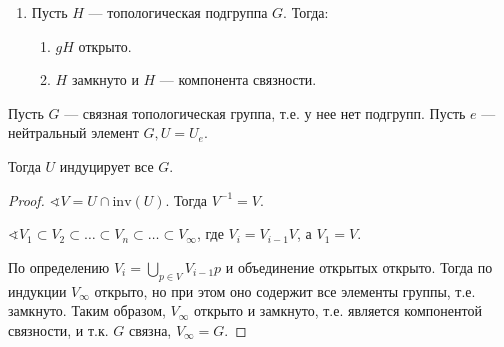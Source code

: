 \begin{prop}
\begin{enumerate}
		      \begin{proof}
			      Пусть \(e\) --- нейтральный элемент группы \(G\), \(V = V_e\).
			      \[e^{-1}e = e \implies \exists U = U_e : U^{-1} U \subset V\]
			      Покажем, что \(\overline{U} \subset V\).
			      \[\sphericalangle x \in \overline{U} \implies \exists O_x : O_x \cap U \neq \emptyset\]
			      \(xU\) содержит точку \(x\), т.к. \(e \in U\), следовательно \(\exists b \in U : xb = a \in U, x = ab^{-1} \in U U^{-1} \subset V \implies \overline{U} \subset V\)
		      \end{proof}
		\item Пусть \(H\) --- топологическая подгруппа \(G\). Тогда:
		      \begin{enumerate}
			      \item \(gH\) открыто.
			      \item \(H\) замкнуто и \(H\) --- компонента связности.
		      \end{enumerate}
	\end{enumerate}
\end{prop}

\begin{theorem}
	Пусть \(G\) --- связная топологическая группа, т.е. у нее нет подгрупп.
	Пусть \(e\) --- нейтральный элемент \(G, U = U_e\).

	Тогда \(U\) индуцирует все \(G\).
\end{theorem}
\begin{proof}
	\(\sphericalangle V = U \cap \mathrm{inv}(U)\). Тогда \(V^{-1} = V\).

	\(\sphericalangle V_1 \subset V_2 \subset \ldots \subset V_n \subset \ldots \subset V_{\infty}\), где \(V_i = V_{i-1} V\), а \(V_1 = V\).

	По определению \(V_i = \bigcup_{p \in V} V_{i - 1} p\) и объединение открытых открыто.
	Тогда по индукции \(V_{\infty}\) открыто, но при этом оно содержит все элементы группы, т.е. замкнуто.
	Таким образом, \(V_{\infty}\) открыто и замкнуто, т.е. является компонентой связности, и т.к. \(G\) связна, \(V_{\infty} = G\).
\end{proof}
